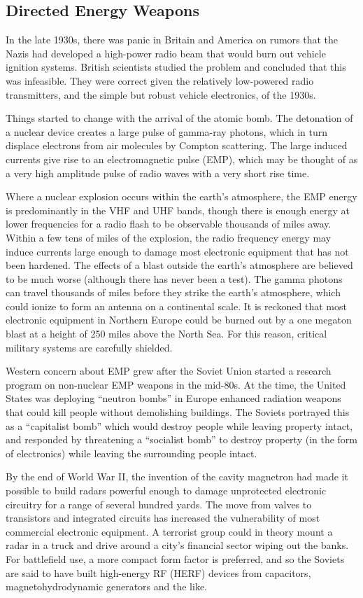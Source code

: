 \documentclass[10pt,journal,compsoc]{IEEEtran}
\begin{document}
\subsection{Directed Energy Weapons}

In the late 1930s, there was panic in Britain and America on rumors that the Nazis had
developed a high-power radio beam that would burn out vehicle ignition systems.
British scientists studied the problem and concluded that this was infeasible.
They were correct given the relatively low-powered radio transmitters, and the simple
but robust vehicle electronics, of the 1930s.

Things started to change with the arrival of the atomic bomb. The detonation of a
nuclear device creates a large pulse of gamma-ray photons, which in turn displace
electrons from air molecules by Compton scattering. The large induced currents give
rise to an electromagnetic pulse (EMP), which may be thought of as a very high amplitude
pulse of radio waves with a very short rise time.

Where a nuclear explosion occurs within the earth’s atmosphere, the EMP energy is
predominantly in the VHF and UHF bands, though there is enough energy at lower frequencies
for a radio flash to be observable thousands of miles away. Within a few tens
of miles of the explosion, the radio frequency energy may induce currents large enough
to damage most electronic equipment that has not been hardened. The effects of a blast
outside the earth’s atmosphere are believed to be much worse (although there has never
been a test). The gamma photons can travel thousands of miles before they strike the
earth’s atmosphere, which could ionize to form an antenna on a continental scale. It is
reckoned that most electronic equipment in Northern Europe could be burned out by a one megaton
blast at a height of 250 miles above the North Sea. For this reason, critical
military systems are carefully shielded.

Western concern about EMP grew after the Soviet Union started a research program
on non-nuclear EMP weapons in the mid-80s. At the time, the United States was deploying
“neutron bombs” in Europe enhanced radiation weapons that could kill people without
demolishing buildings. The Soviets portrayed this as a “capitalist bomb”
which would destroy people while leaving property intact, and responded by threatening
a “socialist bomb” to destroy property (in the form of electronics) while leaving the
surrounding people intact.

By the end of World War II, the invention of the cavity magnetron had made it possible
to build radars powerful enough to damage unprotected electronic circuitry for a
range of several hundred yards. The move from valves to transistors and integrated
circuits has increased the vulnerability of most commercial electronic equipment. A
terrorist group could in theory mount a radar in a truck and drive around a city's financial
sector wiping out the banks. For battlefield use, a more compact form factor is preferred,
and so the Soviets are said to have built high-energy RF (HERF) devices from
capacitors, magnetohydrodynamic generators and the like.
\end{document}
